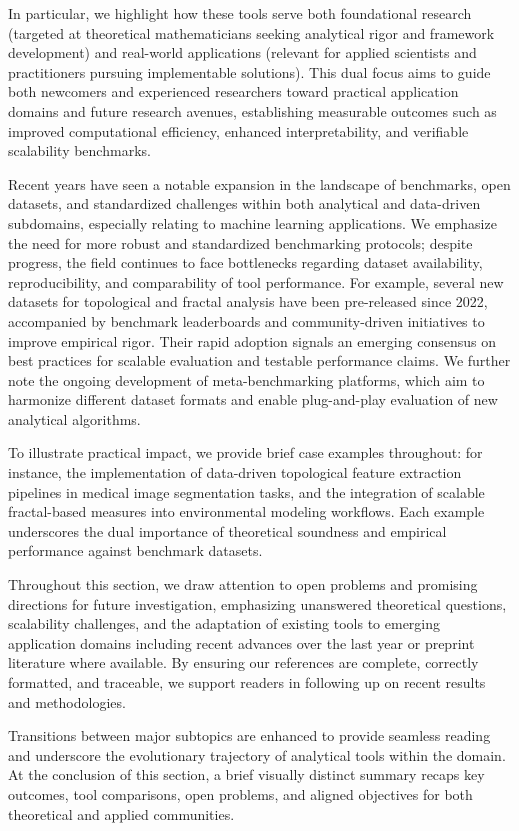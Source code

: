 \documentclass[sigconf]{acmart}
\begin{document}
In particular, we highlight how these tools serve both foundational research (targeted at theoretical mathematicians seeking analytical rigor and framework development) and real-world applications (relevant for applied scientists and practitioners pursuing implementable solutions). This dual focus aims to guide both newcomers and experienced researchers toward practical application domains and future research avenues, establishing measurable outcomes such as improved computational efficiency, enhanced interpretability, and verifiable scalability benchmarks.

Recent years have seen a notable expansion in the landscape of benchmarks, open datasets, and standardized challenges within both analytical and data-driven subdomains, especially relating to machine learning applications. We emphasize the need for more robust and standardized benchmarking protocols; despite progress, the field continues to face bottlenecks regarding dataset availability, reproducibility, and comparability of tool performance. For example, several new datasets for topological and fractal analysis have been pre-released since 2022, accompanied by benchmark leaderboards and community-driven initiatives to improve empirical rigor. Their rapid adoption signals an emerging consensus on best practices for scalable evaluation and testable performance claims. We further note the ongoing development of meta-benchmarking platforms, which aim to harmonize different dataset formats and enable plug-and-play evaluation of new analytical algorithms.

To illustrate practical impact, we provide brief case examples throughout: for instance, the implementation of data-driven topological feature extraction pipelines in medical image segmentation tasks, and the integration of scalable fractal-based measures into environmental modeling workflows. Each example underscores the dual importance of theoretical soundness and empirical performance against benchmark datasets.

Throughout this section, we draw attention to open problems and promising directions for future investigation, emphasizing unanswered theoretical questions, scalability challenges, and the adaptation of existing tools to emerging application domains including recent advances over the last year or preprint literature where available. By ensuring our references are complete, correctly formatted, and traceable, we support readers in following up on recent results and methodologies. 

Transitions between major subtopics are enhanced to provide seamless reading and underscore the evolutionary trajectory of analytical tools within the domain. At the conclusion of this section, a brief visually distinct summary recaps key outcomes, tool comparisons, open problems, and aligned objectives for both theoretical and applied communities. 
\end{document}
